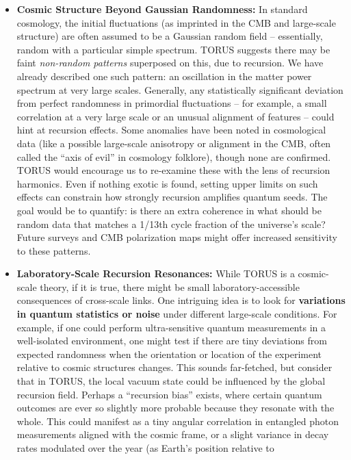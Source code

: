 \begin{itemize}
\item
  \textbf{Cosmic Structure Beyond Gaussian Randomness:} In standard
  cosmology, the initial fluctuations (as imprinted in the CMB and
  large-scale structure) are often assumed to be a Gaussian random field
  -- essentially, random with a particular simple spectrum. TORUS
  suggests there may be faint \emph{non-random patterns} superposed on
  this, due to recursion. We have already described one such pattern: an
  oscillation in the matter power spectrum at very large scales​.
  Generally, any statistically significant deviation from perfect
  randomness in primordial fluctuations -- for example, a small
  correlation at a very large scale or an unusual alignment of features
  -- could hint at recursion effects. Some anomalies have been noted in
  cosmological data (like a possible large-scale anisotropy or alignment
  in the CMB, often called the ``axis of evil'' in cosmology folklore),
  though none are confirmed. TORUS would encourage us to re-examine
  these with the lens of recursion harmonics. Even if nothing exotic is
  found, setting upper limits on such effects can constrain how strongly
  recursion amplifies quantum seeds. The goal would be to quantify: is
  there an extra coherence in what should be random data that matches a
  1/13th cycle fraction of the universe's scale? Future surveys and CMB
  polarization maps might offer increased sensitivity to these patterns.
\item
  \textbf{Laboratory-Scale Recursion Resonances:} While TORUS is a
  cosmic-scale theory, if it is true, there might be small
  laboratory-accessible consequences of cross-scale links. One
  intriguing idea is to look for \textbf{variations in quantum
  statistics or noise} under different large-scale conditions. For
  example, if one could perform ultra-sensitive quantum measurements in
  a well-isolated environment, one might test if there are tiny
  deviations from expected randomness when the orientation or location
  of the experiment relative to cosmic structures changes. This sounds
  far-fetched, but consider that in TORUS, the local vacuum state could
  be influenced by the global recursion field. Perhaps a ``recursion
  bias'' exists, where certain quantum outcomes are ever so slightly
  more probable because they resonate with the whole. This could
  manifest as a tiny angular correlation in entangled photon
  measurements aligned with the cosmic frame, or a slight variance in
  decay rates modulated over the year (as Earth's position relative to

\end{itemize}
